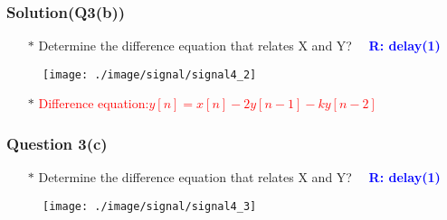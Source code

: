 \documentclass{beamer}
\newcommand{\blue}[1]{\textcolor{blue}{#1}}
\newcommand{\red}[1]{\textcolor{red}{#1}}
\begin{document}

\begin{frame}
\frametitle{Solution(Q3(b))}

\begin{itemize} \itemsep1pt \parskip0pt 
  \item[$\ast$] Determine the difference equation that relates X and Y?  ~~\blue{\bf R: delay(1)}
\end{itemize}



\begin{figure}[H]
  \centering
  \texttt{[image: ./image/signal/signal4\_2]}
\end{figure}

\begin{itemize} \itemsep1pt \parskip0pt 
  \item[$\ast$] \red{Difference equation:$y[n] = x[n] - 2y[n-1] - ky[n-2]$}
\end{itemize}

\end{frame}


\begin{frame}
\frametitle{Question 3(c)}

\begin{itemize} \itemsep1pt \parskip0pt 
  \item[$\ast$] Determine the difference equation that relates X and Y?  ~~\blue{\bf R: delay(1)}
\end{itemize}
\vspace{20 mm}


\begin{figure}[H]
  \centering
  \texttt{[image: ./image/signal/signal4\_3]}
\end{figure}
\vspace{10 mm}

\end{frame}

\end{document}
